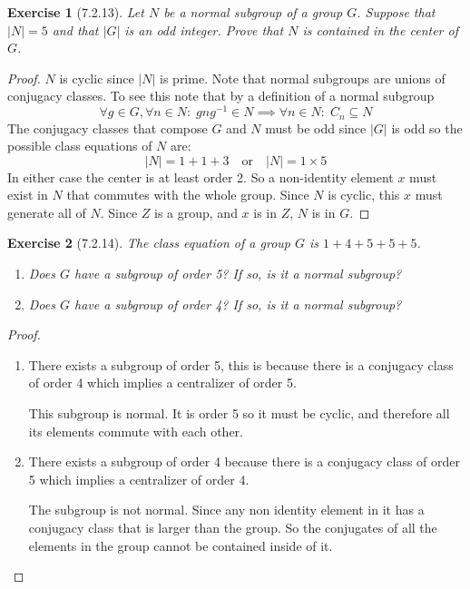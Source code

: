 \documentclass[12pt]{article}
\newtheorem*{exer}{Exercise}
\begin{document}

\begin{exer}[7.2.13]
    Let $N$ be a normal subgroup of a group $G$. Suppose that $|N| = 5$
    and that $|G|$ is an odd integer. Prove that $N$ is contained in the
    center of $G$.
\end{exer}

\begin{proof}
    $N$ is cyclic since $|N|$ is prime. Note that normal subgroups are
    unions of conjugacy classes. To see this note that by a definition
    of a normal subgroup
    \[
        \forall g \in G, \forall n \in N: \; gng^{-1} \in N \implies
        \forall n \in N: \; C_n \subseteq N
    \]
    The conjugacy classes that compose $G$ and $N$ must be odd since
    $|G|$ is odd so the possible class equations of $N$ are:
    \[
        |N| = 1 + 1 + 3 \quad \text{or} \quad |N| = 1 \times 5
    \]
    In either case the center is at least order 2. So a non-identity
    element $x$ must exist in $N$ that commutes with the whole group.
    Since $N$ is cyclic, this $x$ must generate all of $N$. Since $Z$ is
    a group, and $x$ is in $Z$, $N$ is in $G$.

\end{proof}


\begin{exer}[7.2.14]
    The class equation of a group $G$ is $ 1 + 4 + 5 + 5 + 5$.
    \begin{enumerate}
        \item Does $G$ have a subgroup of order 5? If so, is it a normal
            subgroup?
        \item Does $G$ have a subgroup of order 4? If so, is it a normal
            subgroup?
    \end{enumerate}
\end{exer}

\begin{proof}
    \begin{enumerate}
        \item There exists a subgroup of order 5, this is because there
            is a conjugacy class of order 4 which implies a centralizer
            of order 5. 

            This subgroup is normal. It is order 5 so it must be cyclic,
            and therefore all its elements commute with each other.

        \item There exists a subgroup of order 4 because there is a
            conjugacy class of order 5 which implies a centralizer of
            order 4.

            The subgroup is not normal. Since any non identity element
            in it has a conjugacy class that is larger than the group.
            So the conjugates of all the elements in the group cannot be
            contained inside of it.

    \end{enumerate}

\end{proof}
\end{document}
